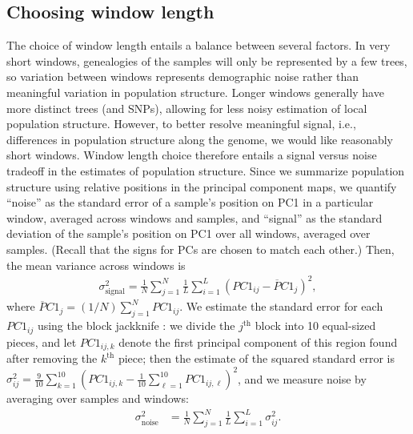 \documentclass[11pt, oneside]{article}   	%
\newcommand{\pcone}{PC1}
\begin{document}
\subsection{Choosing window length}

The choice of window length entails a balance between several factors.
In very short windows, genealogies of the samples will only be represented by a few trees,
so variation between windows represents demographic noise rather than meaningful variation in population structure.
Longer windows generally have more distinct trees (and SNPs), 
allowing for less noisy estimation of local population structure.
However, to better resolve meaningful signal, i.e., differences in population structure along the genome, 
we would like reasonably short windows.
Window length choice therefore entails a signal versus noise tradeoff
in the estimates of population structure.
Since we summarize population structure using relative positions in the principal component maps,
we quantify ``noise'' as the standard error of a sample's position on PC1 in a particular window,
averaged across windows and samples,
and ``signal'' as the standard deviation of the sample's position on PC1 over all windows,
averaged over samples.
(Recall that the signs for PCs are chosen to match each other.)
Then, the mean variance across windows is
\begin{align*}
    \sigma_\text{signal}^2
    = 
    \frac{1}{N} \sum_{j=1}^{N}
        \frac{1}{L}\sum_{i=1}^{L}\left ( \pcone_{ij} -\overline\pcone_{j} \right )^{2} ,
\end{align*}
where $\overline\pcone_j = (1/N) \sum_{j=1}^N \pcone_{ij}$.
We estimate the standard error for each $\pcone_{ij}$ using the block jackknife \citep{efron1982jackknife}:
we divide the $j^\text{th}$ block into 10 equal-sized pieces,
and let $\pcone_{ij,k}$ denote the first principal component of this region found after removing the $k^\text{th}$ piece;
then the estimate of the squared standard error is
$\sigma^2_{ij} = \frac{9}{10} \sum_{k=1}^{10} ( \pcone_{ij,k} - \frac{1}{10} \sum_{\ell=1}^{10} \pcone_{ij,\ell} )^2$,
and we measure noise by averaging over samples and windows:
\begin{align*}
    \sigma^2_\text{noise}
    &=
    \frac{1}{N} \sum_{j=1}^{N} \frac{1}{L}\sum_{i=1}^{L} \sigma^2_{ij} .
\end{align*}
\end{document}
